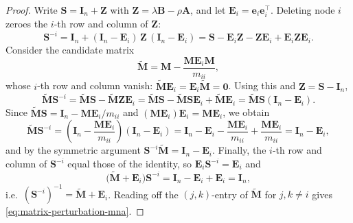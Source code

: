 \begin{proof}
Write $\mathbf{S} = \mathbf{I}_n + \mathbf{Z}$ with $\mathbf{Z} =
\lambda \mathbf{B} - \rho \mathbf{A}$, and let $\mathbf{E}_i =
\mathbf{e}_i \mathbf{e}_i^\top$. Deleting node $i$ zeroes the $i$-th
row and column of $\mathbf{Z}$:
\[
\mathbf{S}^{-i}
=
\mathbf{I}_n + (\mathbf{I}_n - \mathbf{E}_i)\, \mathbf{Z}\,
(\mathbf{I}_n - \mathbf{E}_i)
=
\mathbf{S} - \mathbf{E}_i \mathbf{Z} - \mathbf{Z} \mathbf{E}_i
+ \mathbf{E}_i \mathbf{Z} \mathbf{E}_i .
\]
Consider the candidate matrix
\[
\widetilde{\mathbf{M}}
=
\mathbf{M} - \frac{\mathbf{M} \mathbf{E}_i \mathbf{M}}{m_{ii}},
\]
whose $i$-th row and column vanish:
$\widetilde{\mathbf{M}} \mathbf{E}_i = \mathbf{E}_i
\widetilde{\mathbf{M}} = \mathbf{0}$. Using this and $\mathbf{Z} =
\mathbf{S} - \mathbf{I}_n$,
\[
\widetilde{\mathbf{M}} \mathbf{S}^{-i}
=
\widetilde{\mathbf{M}} \mathbf{S}
- \widetilde{\mathbf{M}} \mathbf{Z} \mathbf{E}_i
=
\widetilde{\mathbf{M}} \mathbf{S}
- \widetilde{\mathbf{M}} \mathbf{S} \mathbf{E}_i
+ \widetilde{\mathbf{M}} \mathbf{E}_i
=
\widetilde{\mathbf{M}} \mathbf{S}
\left( \mathbf{I}_n - \mathbf{E}_i \right).
\]
Since $\widetilde{\mathbf{M}} \mathbf{S} = \mathbf{I}_n -
\mathbf{M} \mathbf{E}_i / m_{ii}$ and $(\mathbf{M} \mathbf{E}_i)
\mathbf{E}_i = \mathbf{M} \mathbf{E}_i$, we obtain
\[
\widetilde{\mathbf{M}} \mathbf{S}^{-i}
=
\left( \mathbf{I}_n - \frac{\mathbf{M} \mathbf{E}_i}{m_{ii}} \right)
\left( \mathbf{I}_n - \mathbf{E}_i \right)
=
\mathbf{I}_n - \mathbf{E}_i
- \frac{\mathbf{M} \mathbf{E}_i}{m_{ii}}
+ \frac{\mathbf{M} \mathbf{E}_i}{m_{ii}}
=
\mathbf{I}_n - \mathbf{E}_i,
\]
and by the symmetric argument $\mathbf{S}^{-i} \widetilde{\mathbf{M}} =
\mathbf{I}_n - \mathbf{E}_i$. Finally, the $i$-th row and column of
$\mathbf{S}^{-i}$ equal those of the identity, so $\mathbf{E}_i
\mathbf{S}^{-i} = \mathbf{E}_i$ and
\[
\bigl( \widetilde{\mathbf{M}} + \mathbf{E}_i \bigr) \mathbf{S}^{-i}
=
\mathbf{I}_n - \mathbf{E}_i + \mathbf{E}_i
=
\mathbf{I}_n,
\]
i.e.\ $(\mathbf{S}^{-i})^{-1} = \widetilde{\mathbf{M}} + \mathbf{E}_i$.
Reading off the $(j,k)$-entry of $\widetilde{\mathbf{M}}$ for
$j, k \neq i$ gives \eqref{eq:matrix-perturbation-mna}.
\end{proof}

